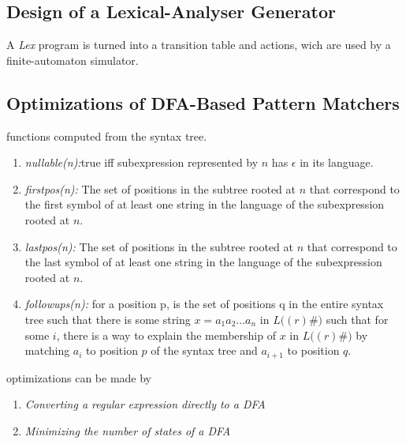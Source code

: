 \subsection{Design of a Lexical-Analyser Generator}
A \emph{Lex} program is turned into a transition table and actions, wich are used by a finite-automaton simulator.

\subsection{Optimizations of DFA-Based Pattern Matchers}
functions computed from the syntax tree.
\begin{enumerate}
	\item{\emph{nullable(n):}true iff subexpression represented by $n$ has $\epsilon$ in its language.}
	\item{\emph{firstpos(n):} The set of positions in the subtree rooted at $n$ that correspond to the first symbol of at least one string in the language of the subexpression rooted at $n$.}
	\item{\emph{lastpos(n):} The set of positions in the subtree rooted at $n$ that correspond to the last symbol of at least one string in the language of the subexpression rooted at $n$.}
	\item{\emph{followups(n):} for a position p, is the set of positions q in the entire syntax tree such that there is some string $x = a_1a_2\ldots a_n$ in $L\big((r)\#)$ such that for some $i$, there is a way to explain the membership of $x$ in $L\big((r)\#\big)$ by matching $a_i$ to position $p$ of the syntax tree and $a_{i+1}$ to position $q$.} 
\end{enumerate}

optimizations can be made by
\begin{enumerate}
	\item{\emph{Converting a regular expression directly to a DFA}}
	\item{\emph{Minimizing the number of states of a DFA}}
\end{enumerate} 





